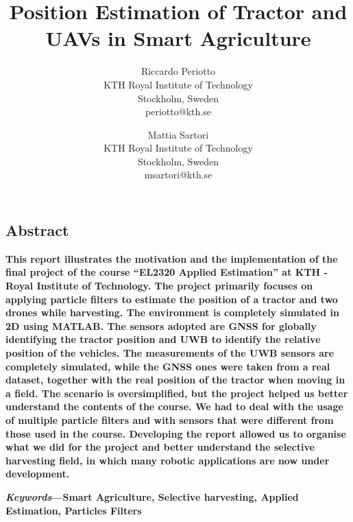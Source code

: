 \documentclass[letterpaper,twocolumn,10pt]{article}
\begin{document}
\date{}

\title{\Large \bf Position Estimation of Tractor and UAVs in Smart Agriculture}

\author{
{\rm Riccardo Periotto}\\
KTH Royal Institute of Technology\\
{\rm Stockholm, Sweden}\\
periotto@kth.se
\and
{\rm Mattia Sartori}\\
KTH Royal Institute of Technology\\
{\rm Stockholm, Sweden}\\
msartori@kth.se
}

\maketitle

\thispagestyle{empty}

\subsection*{Abstract}
\textbf{This report illustrates the motivation and the implementation of the final project of the course “EL2320 Applied Estimation” at KTH - Royal Institute of Technology. The project primarily focuses on applying particle filters to estimate the position of a tractor and two drones while harvesting. The environment is completely simulated in 2D using MATLAB. The sensors adopted are GNSS for globally identifying the tractor position and UWB to identify the relative position of the vehicles. The measurements of the UWB sensors are completely simulated, while the GNSS ones were taken from a real dataset, together with the real position of the tractor when moving in a field. 
The scenario is oversimplified, but the project helped us better understand the contents of the course. We had to deal with the usage of multiple particle filters and with sensors that were different from those used in the course. Developing the report allowed us to organise what we did for the project and better understand the selective harvesting field, in which many robotic applications are now under development.}

\textbf{\textit{Keywords}---Smart Agriculture, Selective harvesting, Applied Estimation, Particles Filters}
\end{document}
